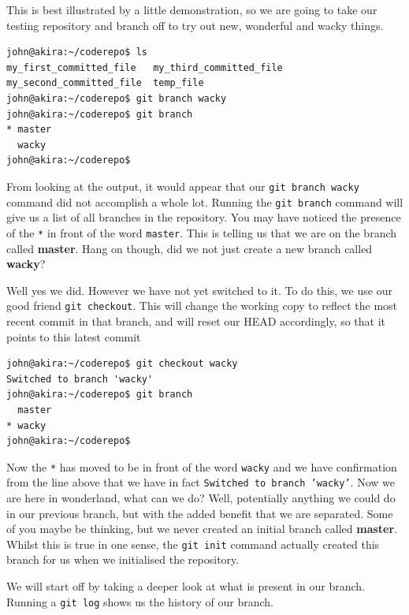 This is best illustrated by a little demonstration, so we are going to take our testing repository and branch off to try out new, wonderful and wacky things.

\begin{Verbatim}[frame=leftline,framerule=1mm,fontsize=\relsize{-3}] 
john@akira:~/coderepo$ ls 
my_first_committed_file   my_third_committed_file
my_second_committed_file  temp_file
john@akira:~/coderepo$ git branch wacky
john@akira:~/coderepo$ git branch
* master
  wacky
john@akira:~/coderepo$ 
\end{Verbatim}

From looking at the output, it would appear that our \texttt{git branch wacky} command did not accomplish a whole lot.  Running the \texttt{git branch} command will give us a list of all branches in the repository.  You may have noticed the presence of the \texttt{*} in front of the word \texttt{master}.  This is telling us that we are on the branch called \textbf{master}.  Hang on though, did we not just create a new branch called \textbf{wacky}?  

Well yes we did.  However we have not yet switched to it.  To do this, we use our good friend \texttt{git checkout}.  This will change the working copy to reflect the most recent commit in that branch, and will reset our HEAD accordingly, so that it points to this latest commit

\begin{Verbatim}[frame=leftline,framerule=1mm,fontsize=\relsize{-3}] 
john@akira:~/coderepo$ git checkout wacky
Switched to branch 'wacky'
john@akira:~/coderepo$ git branch
  master
* wacky
john@akira:~/coderepo$ 
\end{Verbatim}

Now the \texttt{*} has moved to be in front of the word \texttt{wacky} and we have confirmation from the line above that we have in fact \texttt{Switched to branch 'wacky'}.  Now we are here in wonderland, what can we do?  Well, potentially anything we could do in our previous branch, but with the added benefit that we are separated.  Some of you maybe be thinking, but we never created an initial branch called \textbf{master}.  Whilst this is true in one sense, the \texttt{git init} command actually created this branch for us when we initialised the repository.

We will start off by taking a deeper look at what is present in our branch.  Running a \texttt{git log} shows us the history of our branch.  

